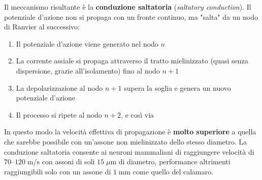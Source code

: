 Il meccanismo risultante è la \textbf{conduzione saltatoria} (\textit{saltatory conduction}). Il potenziale d'azione non si propaga con un fronte continuo, ma "salta" da un nodo di Ranvier al successivo:

\begin{enumerate}
    \item Il potenziale d'azione viene generato nel nodo $n$
    \item La corrente assiale si propaga attraverso il tratto mielinizzato (quasi senza dispersione, grazie all'isolamento) fino al nodo $n+1$
    \item La depolarizzazione al nodo $n+1$ supera la soglia e genera un nuovo potenziale d'azione
    \item Il processo si ripete al nodo $n+2$, e così via
\end{enumerate}

In questo modo la velocità effettiva di propagazione è \textbf{molto superiore} a quella che sarebbe possibile con un'assone non mielinizzato dello stesso diametro. La conduzione saltatoria consente ai neuroni mammaliani di raggiungere velocità di $70$–$120 \; \text{m/s}$ con assoni di soli $15 \; \mu\text{m}$ di diametro, performance altrimenti raggiungibili solo con un assone di $1 \; \text{mm}$ come quello del calamaro.
